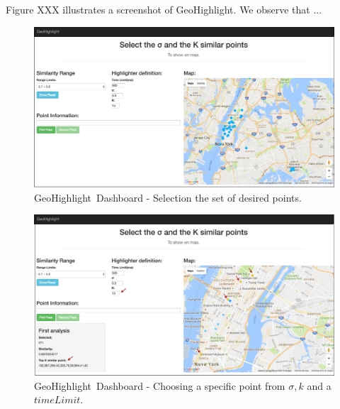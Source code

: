 \documentclass[conference]{IEEEtran}
\newcommand{\sys}{{\sc GeoHighlight}}
\newcommand{\framework}{{\sc GeoHighlight}}
\begin{document}
Figure XXX illustrates a screenshot of \sys. We observe that ...

 \begin{figure}[!ht]
   \centering
   \includegraphics[width=\columnwidth]{figs/dashboard1}
 \caption{\framework\ Dashboard - Selection the set of desired points.}
 \label{fig:dashboard}
 \vspace{-10pt}
 \end{figure}
 \vspace{-5pt}
  \begin{figure}[!ht]
   \centering
   \includegraphics[width=\columnwidth]{figs/dashboard2}
 \caption{\framework\ Dashboard - Choosing a specific point from $\sigma, k$ and a $timeLimit$.}
 \label{fig:dashboard2}
 \vspace{-10pt}
 \end{figure}

%

\vspace{-5pt}
\end{document}
